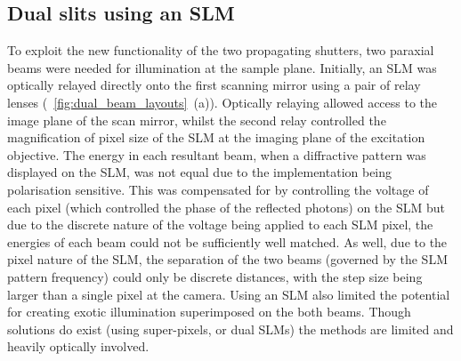 \subsection{Dual slits using an \gls{SLM}}

To exploit the new functionality of the two propagating shutters, two paraxial beams were needed for illumination at the sample plane.
Initially, an \gls{SLM} was optically relayed directly onto the first scanning mirror using a pair of relay lenses (\figurename~\ref{fig:dual_beam_layouts}~(a)).
Optically relaying allowed access to the image plane of the scan mirror, whilst the second relay controlled the magnification of pixel size of the \gls{SLM} at the imaging plane of the excitation objective.
The energy in each resultant beam, when a diffractive pattern was displayed on the \gls{SLM}, was not equal due to the implementation being polarisation sensitive.
This was compensated for by controlling the voltage of each pixel (which controlled the phase of the reflected photons) on the \gls{SLM} but due to the discrete nature of the voltage being applied to each \gls{SLM} pixel, the energies of each beam could not be sufficiently well matched.
As well, due to the pixel nature of the \gls{SLM}, the separation of the two beams (governed by the \gls{SLM} pattern frequency) could only be discrete distances, with the step size being larger than a single pixel at the camera.
Using an \gls{SLM} also limited the potential for creating exotic illumination superimposed on the both beams.
Though solutions do exist (using super-pixels\cite{puttenSpatialAmplitudePhase2008}, or dual SLMs\cite{fuImagingMulticellularSpecimens2016a}) the methods are limited and heavily optically involved.
